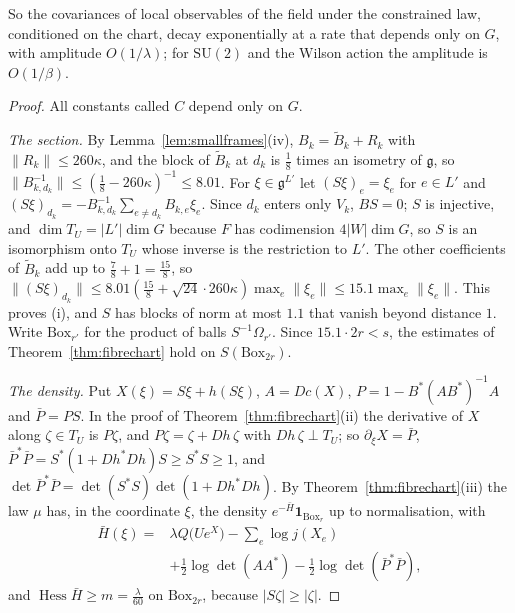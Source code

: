 \documentclass[11pt]{amsart}
\theoremstyle{definition}
\theoremstyle{remark}
\numberwithin{equation}{section}
\newcommand{\SU}{\mathrm{SU}}
\newcommand{\g}{\mathfrak{g}}
\begin{document}
So the covariances of local observables of the field under the
constrained law, conditioned on the chart, decay exponentially at a rate
that depends only on $G$, with amplitude $O(1/\lambda)$; for $\SU(2)$ and
the Wilson action the amplitude is $O(1/\beta)$.

\begin{proof}
All constants called $C$ depend only on $G$.

\emph{The section.} By Lemma~\ref{lem:smallframes}(iv), $B_k=\tilde B_k+R_k$
with $\lVert R_k\rVert\le260\kappa$, and the block of $\tilde B_k$ at $d_k$
is $\frac18$ times an isometry of $\g$, so $\lVert B_{k,d_k}^{-1}\rVert\le
(\frac18-260\kappa)^{-1}\le8.01$. For $\xi\in\g^{L'}$ let $(S\xi)_e=\xi_e$
for $e\in L'$ and $(S\xi)_{d_k}=-B_{k,d_k}^{-1}\sum_{e\ne d_k}B_{k,e}\xi_e$.
Since $d_k$ enters only $V_k$, $BS=0$; $S$ is injective, and $\dim T_U=
\lvert L'\rvert\dim G$ because $F$ has codimension $4\lvert W\rvert\dim G$,
so $S$ is an isomorphism onto $T_U$ whose inverse is the restriction to
$L'$. The other coefficients of $\tilde B_k$ add up to $\frac78+1=\frac{15}8$,
so $\lVert(S\xi)_{d_k}\rVert\le8.01(\frac{15}8+\sqrt{24}\cdot260\kappa)\max
_e\lVert\xi_e\rVert\le15.1\max_e\lVert\xi_e\rVert$. This proves (i), and
$S$ has blocks of norm at most $1.1$ that vanish beyond distance $1$. Write
$\mathrm{Box}_{r'}$ for the product of balls $S^{-1}\Omega_{r'}$. Since
$15.1\cdot2r<s$, the estimates of Theorem~\ref{thm:fibrechart} hold on
$S(\mathrm{Box}_{2r})$.

\emph{The density.} Put $X(\xi)=S\xi+h(S\xi)$, $A=Dc(X)$, $P=1-B^*(AB^*)
^{-1}A$ and $\bar P=PS$. In the proof of Theorem~\ref{thm:fibrechart}(ii)
the derivative of $X$ along $\zeta\in T_U$ is $P\zeta$, and $P\zeta=\zeta
+Dh\,\zeta$ with $Dh\,\zeta\perp T_U$; so $\partial_\xi X=\bar P$, $\bar P^*
\bar P=S^*(1+Dh^*Dh)S\ge S^*S\ge1$, and $\det\bar P^*\bar P=\det(S^*S)\det
(1+Dh^*Dh)$. By Theorem~\ref{thm:fibrechart}(iii) the law $\mu$ has, in the
coordinate $\xi$, the density $e^{-\bar H}\mathbf 1_{\mathrm{Box}_r}$ up to
normalisation, with
\[
\begin{split}
\bar H(\xi)={}&\lambda Q\bigl(Ue^{X}\bigr)-\sum_e\log j(X_e)\\
&+\tfrac12\log\det(AA^*)-\tfrac12\log\det(\bar P^*\bar P),
\end{split}
\]
and $\operatorname{Hess}\bar H\ge m=\frac\lambda{60}$ on
$\mathrm{Box}_{2r}$, because $\lvert S\zeta\rvert\ge\lvert\zeta\rvert$.


\end{proof}
\end{document}
